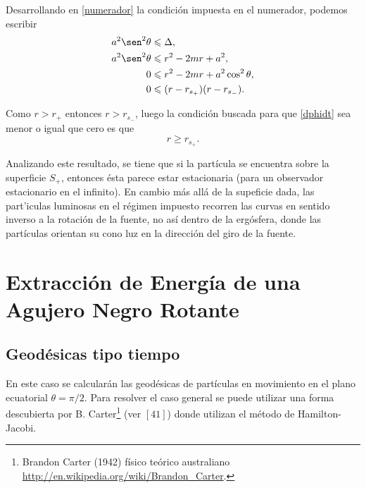 Desarrollando en \eqref{numerador} la condici\'on impuesta en el numerador, podemos escribir
\begin{equation}
\begin{aligned}
a^2\sen^2 \theta &\leqslant \Delta ,\\
 a^2\sen^2 \theta &\leqslant r^2-2mr+a^2 , \\
 0 &\leqslant r^2-2mr+a^2\cos^2 \theta ,\\
 0 &\leqslant (r-r_{s_{+}})(r-r_{s_{-}}).\\
\end{aligned}
\end{equation}

Como $r>r_{+}$ entonces $r>r_{s_-}$, luego la condici\'on buscada para que \eqref{dphidt} sea menor o igual que cero es que
\begin{equation}
r\geqslant r_{s_+}.
\end{equation}

Analizando este resultado, se tiene que si la part\'icula se encuentra sobre la superficie $S_+$, entonces \'esta parece estar estacionaria (para un observador estacionario en el infinito). En cambio m\'as all\'a de la supeficie dada, las part'iculas luminosas en el r\'egimen impuesto recorren las curvas en sentido inverso a la rotaci\'on de la fuente, no as\'i dentro de la erg\'osfera, donde las part\'iculas orientan su cono luz en la direcci\'on del giro de la fuente.\\

\section{Extracci\'on de Energ\'ia de una Agujero Negro Rotante}

\subsection{Geod\'esicas tipo tiempo}

En este caso se calcular\'an las geod\'esicas de part\'iculas en movimiento en el plano ecuatorial $\theta=\pi/2$. Para resolver el caso general se puede utilizar una forma descubierta por B. Carter\footnote{Brandon Carter (1942) f\'isico te\'orico australiano \url{http://en.wikipedia.org/wiki/Brandon_Carter}.} (ver $[41]$) donde utilizan el m\'etodo de Hamilton-Jacobi.

